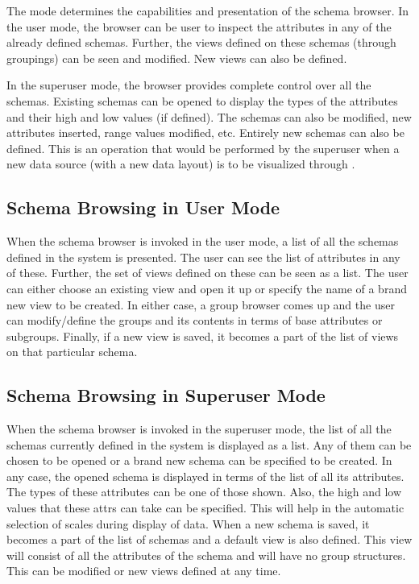 The mode determines the capabilities and presentation of the schema
browser.  In the user mode, the browser can be user to inspect the
attributes in any of the already defined schemas. Further, the views
defined on these schemas (through groupings) can be seen and
modified. New views can also be defined.

In the superuser mode, the browser provides complete control over all
the schemas. Existing schemas can be opened to display the types of
the attributes and their high and low values (if defined). The schemas
can also be modified, new attributes inserted, range values modified,
etc. Entirely new schemas can also be defined.  This is an operation
that would be performed by the superuser when a new data source (with
a new data layout) is to be visualized through \Devise.

\subsection{Schema Browsing in User Mode}

When the schema browser is invoked in the user mode, a list of all the
schemas defined in the system is presented. The user can see the list
of attributes in any of these. Further, the set of views defined on
these can be seen as a list.  The user can either choose an existing
view and open it up or specify the name of a brand new view to be
created. In either case, a group browser comes up and the user can
modify/define the groups and its contents in terms of base attributes
or subgroups. Finally, if a new view is saved, it becomes a part of
the list of views on that particular schema.

\subsection{Schema Browsing in Superuser Mode}

When the schema browser is invoked in the superuser mode, the list of
all the schemas currently defined in the system is displayed as a
list. Any of them can be chosen to be opened or a brand new schema can
be specified to be created. In any case, the opened schema is
displayed in terms of the list of all its attributes. The types of
these attributes can be one of those shown. Also, the high and low
values that these attrs can take can be specified.  This will help in
the automatic selection of scales during display of data. When a new
schema is saved, it becomes a part of the list of schemas and a
default view is also defined.  This view will consist of all the
attributes of the schema and will have no group structures. This can
be modified or new views defined at any time.

